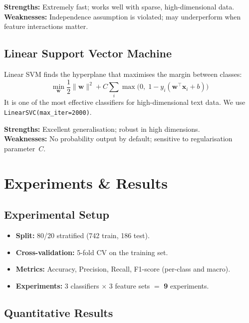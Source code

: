 \documentclass[conference, 10pt]{IEEEtran}
\begin{document}
\textbf{Strengths:} Extremely fast; works well with sparse, high-dimensional data.\\
\textbf{Weaknesses:} Independence assumption is violated; may underperform when feature interactions matter.

\subsection{Linear Support Vector Machine}

Linear SVM finds the hyperplane that maximises the margin between classes:
\begin{equation}
\min_{\mathbf{w}} \frac{1}{2}\|\mathbf{w}\|^2 + C \sum_{i} \max\!\bigl(0,\; 1 - y_i(\mathbf{w}^{\top}\mathbf{x}_i + b)\bigr)
\end{equation}
It is one of the most effective classifiers for high-dimensional text data.
We use \texttt{LinearSVC(max\_iter=2000)}.

\textbf{Strengths:} Excellent generalisation; robust in high dimensions.\\
\textbf{Weaknesses:} No probability output by default; sensitive to regularisation parameter~$C$.


\section{Experiments \& Results}
\label{sec:results}

\subsection{Experimental Setup}

\begin{itemize}[noitemsep]
  \item \textbf{Split:} 80/20 stratified (742 train, 186 test).
  \item \textbf{Cross-validation:} 5-fold CV on the training set.
  \item \textbf{Metrics:} Accuracy, Precision, Recall, F1-score (per-class and macro).
  \item \textbf{Experiments:} 3 classifiers $\times$ 3 feature sets $=$ \textbf{9} experiments.
\end{itemize}

\subsection{Quantitative Results}
\end{document}
